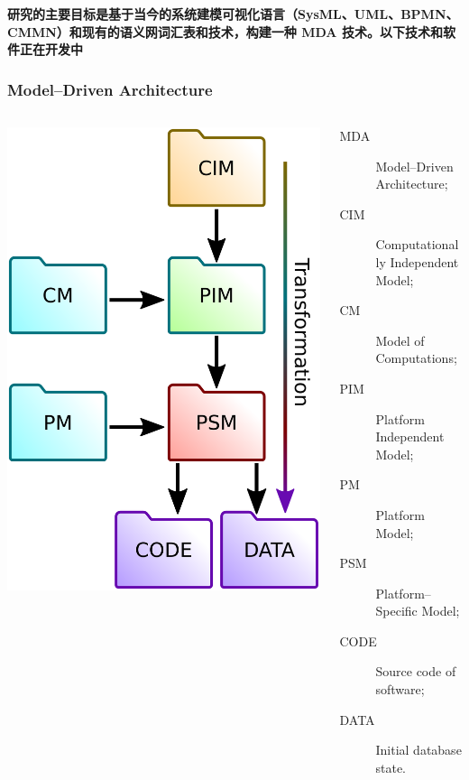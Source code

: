 \documentclass[10pt]{beamer}
\begin{document}
  \textbf{研究的主要目标是基于当今的系统建模可视化语言（SysML、UML、BPMN、CMMN）和现有的语义网词汇表和技术，构建一种 MDA 技术。以下技术和软件正在开发中}
\begin{frame}[fragile]
  \frametitle{Model--Driven Architecture}

  \begin{columns}
    \begin{column}{0.4\textwidth}
      \includegraphics[width=1\linewidth]{mda-most-general.pdf}
    \end{column}
    \begin{column}{0.7\linewidth}
      \begin{description}
      \item[MDA] Model--Driven Architecture;
      \item[CIM] Computationally Independent Model;
      \item[CM] Model of Computations;
      \item[PIM] Platform Independent Model;
      \item[PM] Platform Model;
      \item[PSM] Platform--Specific Model;
      \item[CODE] Source code of software;
      \item[DATA] Initial database state.
      \end{description}
    \end{column}
  \end{columns}
\end{frame}
\end{document}
